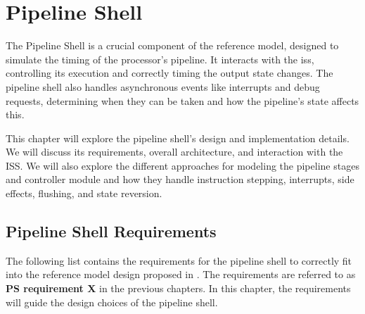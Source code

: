 \chapter{Pipeline Shell}
\label{ch:PipelineShell}


The Pipeline Shell is a crucial component of the reference model, designed to simulate the timing of the processor's pipeline. It interacts with the \acrfull{iss}, controlling its execution and correctly timing the output state changes. The pipeline shell also handles asynchronous events like interrupts and debug requests, determining when they can be taken and how the pipeline's state affects this.

This chapter will explore the pipeline shell's design and implementation details. We will discuss its requirements, overall architecture, and interaction with the ISS. We will also explore the different approaches for modeling the pipeline stages and controller module and how they handle instruction stepping, interrupts, side effects, flushing, and state reversion.


\section{Pipeline Shell Requirements}

The following list contains the requirements for the pipeline shell to correctly fit into the reference model design proposed in . The requirements are referred to as \textbf{PS requirement X} in the previous chapters.
In this chapter, the requirements will guide the design choices of the pipeline shell.

